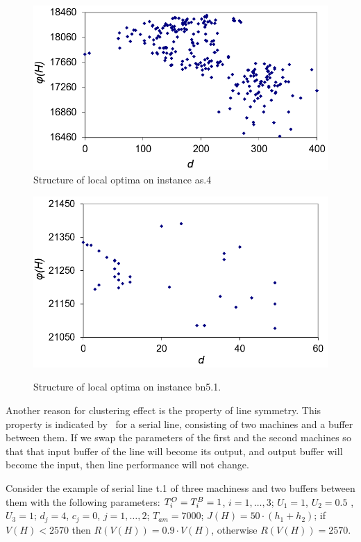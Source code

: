 \documentclass{ifacconf}
\begin{document}
 \begin{figure}[h!]
	\centering
	\includegraphics[scale=0.5]{multistart_klaster}
  \caption{Structure of local optima on instance  as.4 } \label{fig:multistart_klaster}
  \end{figure}
\begin{figure}[h!]
	\begin{center}
		\includegraphics[scale=0.5]{klaster_bn5_1.png}\\
		\caption{Structure of local optima on instance bn5.1.} \label{klaster_bn5_1}
	\end{center}
\end{figure} 

Another reason for clustering effect is the property of
line symmetry. This property is indicated by~\cite{LP} for a serial line,
consisting of two machines and a buffer
between them. If we swap the parameters of the first and the second machines so that
that input buffer of the line will become its output, and output buffer will become the input, then
line performance will not change.

Consider the example of serial line t.1 of
three machiness and two buffers between them with the following parameters: ${T^{\rm O}_i=T^{\rm B}_i=1}$, $i = 1,\ldots,3$;
 ${U_1=1}$, ${U_2=0.5}$ , ${U_3=1}$;
 ${d_j=4}$, ${c_j=0}$, $j = 1,\ldots,2$;
 $T_{am}=7000$;
 $J(H)=50\cdot(h_1+h_2)$;
 if $V(H) < 2570$ then $R(V(H))=0.9\cdot V(H)$, otherwise $R(V(H))=2570$.
\end{document}
